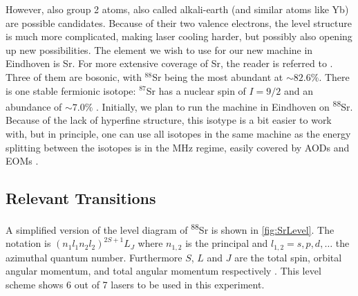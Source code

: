 However, also group 2 atoms, also called alkali-earth (and similar atoms like Yb) are possible candidates. 
Because of their two valence electrons, the level structure is much more complicated, making laser cooling harder, but possibly also opening up new possibilities.
The element we wish to use for our new machine in Eindhoven is Sr.
For more extensive coverage of Sr, the reader is referred to \cite{Stellmer2013}. Three of them are bosonic, with ${}^{88}$Sr being the most abundant at $\sim82.6\%$. There is one stable fermionic isotope: ${}^{87}$Sr has a nuclear spin of $I=9/2$ and an abundance of $\sim7.0\%$ \cite{Coursey1999}.
Initially, we plan to run the machine in Eindhoven on \textsuperscript{88}Sr. 
Because of the lack of hyperfine structure, this isotype is a bit easier to work with, but in principle, one can use all isotopes in the same machine as the energy splitting between the isotopes is in the MHz regime, easily covered by AODs and EOMs \cite{Stellmer2013}.

\subsection{Relevant Transitions}

A simplified version of the level diagram of \textsuperscript{88}Sr is shown in \cref{fig:SrLevel}. 
The notation is $(n_1l_1 n_2l_2)^{2S+1}L_J$ where $n_{1,2}$ is the principal and $l_{1,2} = s, p, d, \ldots$ the azimuthal quantum number. 
Furthermore $S$, $L$ and $J$ are the total spin, orbital angular momentum, and total angular momentum respectively \cite{Cowan1981}. 
This level scheme shows 6 out of 7 lasers to be used in this experiment. 

